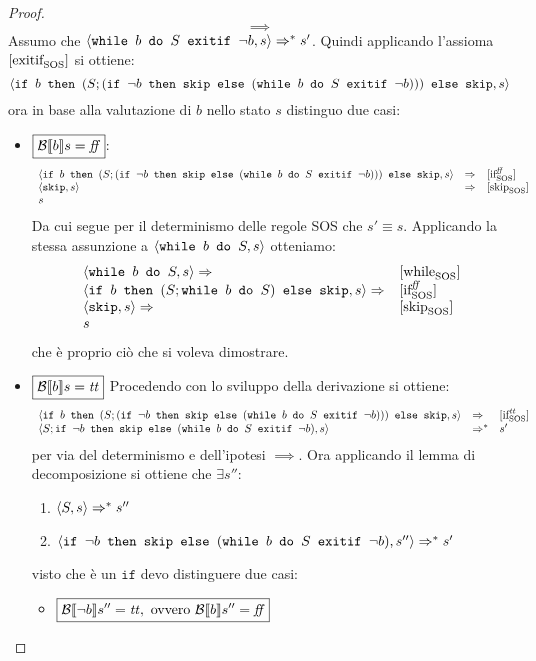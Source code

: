 {\begin{enumerate}
\begin{proof}
$$
\boxed{\implies}
$$
Assumo che $\confSs{\wbSE{b}{S}{\neg b}}{s} \Rar{*} s'$.
Quindi applicando l'assioma $\exitifSOS$ si ottiene:
$$
\confSs{\ifABC{b}{(S; (\ifABC{\neg b}{\skipForFriends}{(\wbSE{b}{S}{\neg b})}))}{\skipForFriends}}{s}
$$
ora in base alla valutazione di $b$ nello stato $s$ distinguo due casi:
\begin{itemize}
	\item $\boxed{\B{b} = \semfalse}$:
	$$
	\begin{array}{lll}
	\confSs{\ifABC{b}{(S; (\ifABC{\neg b}{\skipForFriends}{(\wbSE{b}{S}{\neg b})}))}{\skipForFriends}}{s} & \Rar{} & \ifffSOS \\
	\confSs{\skipForFriends}{s} & \Rar{}& \skipSOS \\
	s
	\end{array}
	$$
	Da cui segue per il determinismo delle regole SOS che $s' \equiv s$.
	Applicando la stessa assunzione a $\confSs{\wbS{b}{S}}{s}$ otteniamo:
	$$
	\begin{array}{ll}
	\confSs{\wbS{b}{S}}{s} \Rar{}& \whileSOS \\
	\confSs{\ifABC{b}{(S; \wbS{b}{S})}{\skipForFriends}}{s} \Rar{} & \ifffSOS \\ 
	\confSs{\skipForFriends}{s} \Rar{}& \skipSOS \\
	s
	\end{array}
	$$
	che è proprio ciò che si voleva dimostrare.
	\item $\boxed{\B{b} = \semtrue}$
	Procedendo con lo sviluppo della derivazione si ottiene:
	$$
	\begin{array}{lll}
	\confSs{\ifABC{b}{(S; (\ifABC{\neg b}{\skipForFriends}{(\wbSE{b}{S}{\neg b})}))}{\skipForFriends}}{s} & \Rar{} & \ifttSOS \\
	\confSs{S; \ifABC{\neg b}{\skipForFriends}{(\wbSE{b}{S}{\neg b})}}{s} & \Rar{*} & s'\\
	\end{array}
	$$
	per via del determinismo e dell'ipotesi $\implies$.
	Ora applicando il lemma di decomposizione si ottiene che $\exists s''$:
	\begin{enumerate}
	\item $\confSs{S}{s} \Rar{*} s''$
	\label{hw6:Ssgoestos''}
	\item $\confSs{\ifABC{\neg b}{\skipForFriends}{(\wbSE{b}{S}{\neg b})}}{s''} \Rar{*} s'$
	\label{hw6:ifnegb}
	\end{enumerate}
	visto che è un $\texttt{if}$ devo distinguere due casi:
	\begin{itemize}
		\item $\boxed{\B{\neg b}'' = \semtrue, \text{ ovvero } \B{b}'' = \semfalse}$

\end{itemize}
\end{itemize}
\end{proof}
\end{enumerate}}

